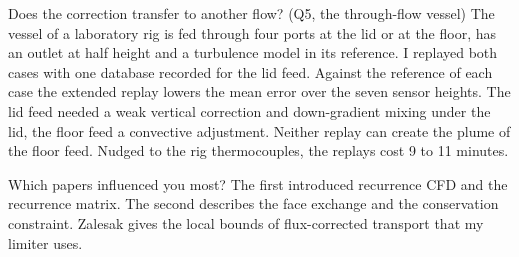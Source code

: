 \begin{qabox}{Does the correction transfer to another flow? (Q5, the through-flow vessel)}
\explain The vessel of a laboratory rig is fed through four ports at the lid or at the floor, has an
outlet at half height and a turbulence model in its reference. I replayed both cases with one
database recorded for the lid feed. Against the reference of each case the extended replay lowers the
mean error over the seven sensor heights. The lid feed needed a weak vertical correction and
down-gradient mixing under the lid, the floor feed a convective adjustment. Neither replay can create
the plume of the floor feed. Nudged to the rig thermocouples, the replays cost 9 to 11 minutes.
\end{qabox}

\begin{qabox}{Which papers influenced you most?}
\explain The first introduced recurrence CFD and the recurrence matrix. The second describes the
face exchange and the conservation constraint. Zalesak gives the local bounds of flux-corrected
transport that my limiter uses.
\end{qabox}
